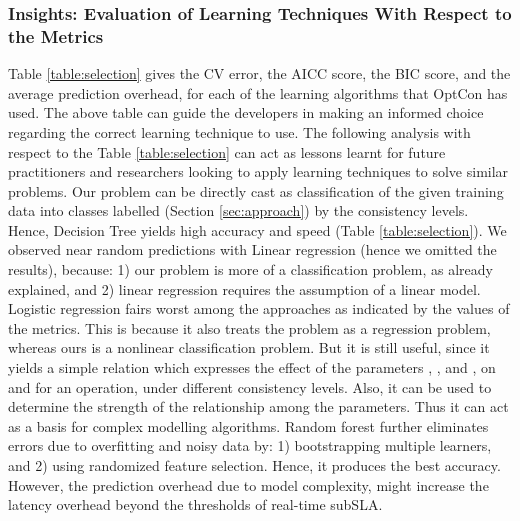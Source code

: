 \documentclass[conference]{IEEEtran}
\begin{document}
  \subsubsection{Insights: Evaluation of Learning Techniques With Respect to the Metrics}\label{sec:compareresults}
  \begin{table}[!htb]
\caption{Model Selection Results: As per descending order of AICC and BIC, and ascending order of CV and Overhead}
\label{table:selection}
\end{table}
Table \ref{table:selection} gives the CV error, the AICC score, the BIC score, and the average prediction overhead, for each of the learning algorithms that OptCon has used.
   The above table can guide the developers in making an informed choice regarding the correct learning technique to use. The following analysis with respect to the Table \ref{table:selection} can act as lessons learnt for future practitioners and researchers looking to apply learning techniques to solve similar problems.
    Our problem can be directly cast as classification of the given training data into classes labelled (Section \ref{sec:approach}) by the consistency levels. Hence, Decision Tree yields high accuracy and speed (Table \ref{table:selection}). We observed near random predictions with Linear regression (hence we omitted the results),  because: 1) our problem is more of a classification problem, as already explained, and 2) linear regression requires the assumption of a linear model. Logistic regression fairs worst among the approaches as indicated by the values of the metrics. This is because it also treats the problem as a  regression problem,  whereas ours is a nonlinear classification problem. But it is still useful, since it yields a simple relation which expresses the effect of the parameters , , and , on  and  for an operation, under different consistency levels. Also, it can be used to determine the strength of the relationship among the parameters. Thus it can act as a basis for complex modelling algorithms. Random forest further eliminates errors due to overfitting and noisy data by: 1) bootstrapping multiple learners,  and 2) using randomized feature selection. Hence, it produces the best accuracy. However, the prediction overhead due to model complexity, might increase the latency overhead beyond the thresholds of real-time subSLA.
\end{document}
